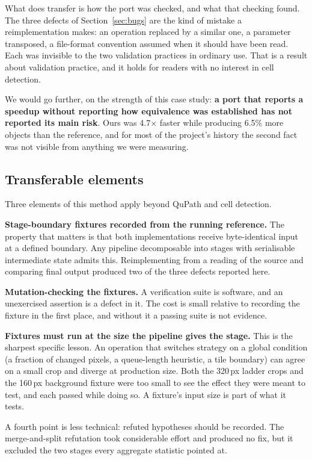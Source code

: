 \documentclass[11pt,a4paper]{article}
\begin{document}
What does transfer is how the port was checked, and what that checking found.
The three defects of Section~\ref{sec:bugs} are the kind of mistake a
reimplementation makes: an operation replaced by a similar one, a parameter
transposed, a file-format convention assumed when it should have been read.
Each was invisible to the two validation practices in ordinary use. That is a
result about validation practice, and it holds for readers with no interest in
cell detection.

We would go further, on the strength of this case study: \textbf{a port that
reports a speedup without reporting how equivalence was established has not
reported its main risk}. Ours was 4.7$\times$ faster while producing 6.5\%
more objects than the reference, and for most of the project's history the
second fact was not visible from anything we were measuring.

\subsection{Transferable elements}

Three elements of this method apply beyond QuPath and cell detection.

\textbf{Stage-boundary fixtures recorded from the running reference.} The
property that matters is that both implementations receive byte-identical input
at a defined boundary. Any pipeline decomposable into stages with serialisable
intermediate state admits this. Reimplementing from a reading of the source and
comparing final output produced two of the three defects reported here.

\textbf{Mutation-checking the fixtures.} A verification suite is software, and
an unexercised assertion is a defect in it. The cost is small relative to
recording the fixture in the first place, and without it a passing suite is not
evidence.

\textbf{Fixtures must run at the size the pipeline gives the stage.} This is
the sharpest specific lesson. An operation that switches strategy on a global
condition (a fraction of changed pixels, a queue-length heuristic, a tile
boundary) can agree on a small crop and diverge at production size. Both the
320\,px ladder crops and the 160\,px background fixture were too small to see
the effect they were meant to test, and each passed while doing so. A fixture's
input size is part of what it tests.

A fourth point is less technical: refuted hypotheses should be recorded. The
merge-and-split refutation took considerable effort and produced no fix, but it
excluded the two stages every aggregate statistic pointed at.
\end{document}
